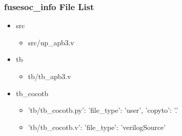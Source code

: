 \subsubsection{fusesoc\_info File List}
\begin{itemize}
\item src
	\begin{itemize}
	\item src/up\_apb3.v
	\end{itemize}
\item tb
	\begin{itemize}
	\item tb/tb\_apb3.v
	\end{itemize}
\item tb\_cocotb
	\begin{itemize}
	\item {'tb/tb\_cocotb.py': {'file\_type': 'user', 'copyto': '.'}}
	\item {'tb/tb\_cocotb.v': {'file\_type': 'verilogSource'}}
	\end{itemize}
\end{itemize}
